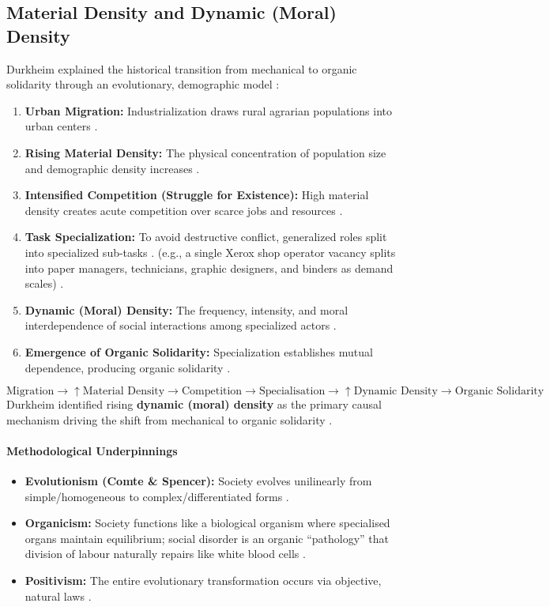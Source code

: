 \subsection{Material Density and Dynamic (Moral) Density}
Durkheim explained the historical transition from mechanical to organic solidarity through an evolutionary, demographic model :
\begin{enumerate}
    \item \textbf{Urban Migration:} Industrialization draws rural agrarian populations into urban centers .
    \item \textbf{Rising Material Density:} The physical concentration of population size and demographic density increases .
    \item \textbf{Intensified Competition (Struggle for Existence):} High material density creates acute competition over scarce jobs and resources .
    \item \textbf{Task Specialization:} To avoid destructive conflict, generalized roles split into specialized sub-tasks . (e.g., a single Xerox shop operator vacancy splits into paper managers, technicians, graphic designers, and binders as demand scales) .
    \item \textbf{Dynamic (Moral) Density:} The frequency, intensity, and moral interdependence of social interactions among specialized actors .
    \item \textbf{Emergence of Organic Solidarity:} Specialization establishes mutual dependence, producing organic solidarity .
\end{enumerate}

\begin{DataFact}
$$\text{Migration} \longrightarrow \uparrow \text{Material Density} \longrightarrow \text{Competition} \longrightarrow \text{Specialisation} \longrightarrow \uparrow \text{Dynamic Density} \longrightarrow \text{Organic Solidarity}$$
Durkheim identified rising \textbf{dynamic (moral) density} as the primary causal mechanism driving the shift from mechanical to organic solidarity .
\end{DataFact}

\paragraph{Methodological Underpinnings}
\begin{itemize}
    \item \textbf{Evolutionism (Comte \& Spencer):} Society evolves unilinearly from simple/homogeneous to complex/differentiated forms .
    \item \textbf{Organicism:} Society functions like a biological organism where specialised organs maintain equilibrium; social disorder is an organic ``pathology'' that division of labour naturally repairs like white blood cells .
    \item \textbf{Positivism:} The entire evolutionary transformation occurs via objective, natural laws .
\end{itemize}

